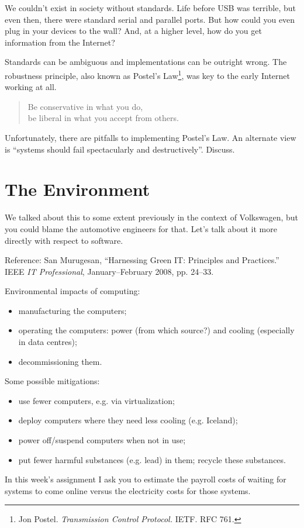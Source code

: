 \documentclass[11pt]{article}
\begin{document}
We couldn't exist in society without standards. Life before USB was terrible, but even then, there were standard serial and parallel ports. But how could you even plug in your devices to the wall? And, at a higher level, how do you get information from the Internet?

Standards can be ambiguous and implementations can be outright wrong. The robustness principle, also known as Postel's Law\footnote{Jon Postel. \emph{Transmission Control Protocol.} IETF. RFC 761.}, was key to the early Internet working at all.
\begin{quote}
  Be conservative in what you do,\\
  be liberal in what you accept from others.
\end{quote}

Unfortunately, there are pitfalls to implementing Postel's Law. An alternate view is ``systems should fail spectacularly and destructively''. Discuss.

\section*{The Environment}
We talked about this to some extent previously in the context of Volkswagen, but you could blame the automotive engineers for that. Let's talk about it more directly with respect to software.

\noindent
Reference: San Murugesan, ``Harnessing Green IT: Principles and Practices.'' IEEE \emph{IT Professional}, January--February 2008, pp. 24--33.

Environmental impacts of computing:
\begin{itemize}
\item manufacturing the computers;
\item operating the computers: power (from which source?) and cooling (especially in data centres);
\item decommissioning them.
\end{itemize}

Some possible mitigations:
\begin{itemize}
\item use fewer computers, e.g. via virtualization;
\item deploy computers where they need less cooling (e.g. Iceland);
\item power off/suspend computers when not in use;
\item put fewer harmful substances (e.g. lead) in them; recycle these substances.
\end{itemize}

In this week's assignment I ask you to estimate the payroll costs of waiting for systems to come online versus the electricity costs for those systems.



\end{document}
